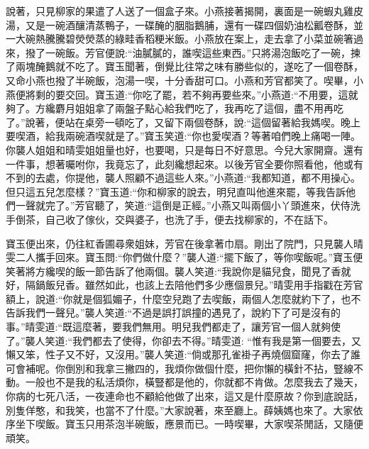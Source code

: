 \begin{parag}
    說著，只見柳家的果遣了人送了一個盒子來。小燕接著揭開，裏面是一碗蝦丸雞皮湯，又是一碗酒釀清蒸鴨子，一碟醃的胭脂鵝脯，還有一碟四個奶油松瓤卷酥，並一大碗熱騰騰碧熒熒蒸的綠畦香稻粳米飯。小燕放在案上，走去拿了小菜並碗箸過來，撥了一碗飯。芳官便說:“油膩膩的，誰喫這些東西。”只將湯泡飯吃了一碗，揀了兩塊醃鵝就不吃了。寶玉聞著，倒覺比往常之味有勝些似的，遂吃了一個卷酥，又命小燕也撥了半碗飯，泡湯一喫，十分香甜可口。小燕和芳官都笑了。喫畢，小燕便將剩的要交回。寶玉道:“你吃了罷，若不夠再要些來。”小燕道:“不用要，這就夠了。方纔麝月姐姐拿了兩盤子點心給我們吃了，我再吃了這個，盡不用再吃了。”說著，便站在桌旁一頓吃了，又留下兩個卷酥，說:“這個留著給我媽喫。晚上要喫酒，給我兩碗酒喫就是了。”寶玉笑道:“你也愛喫酒？等著咱們晚上痛喝一陣。你襲人姐姐和晴雯姐姐量也好，也要喝，只是每日不好意思。今兒大家開齋。還有一件事，想著囑咐你，我竟忘了，此刻纔想起來。以後芳官全要你照看他，他或有不到的去處，你提他，襲人照顧不過這些人來。”小燕道:“我都知道，都不用操心。但只這五兒怎麼樣？”寶玉道:“你和柳家的說去，明兒直叫他進來罷，等我告訴他們一聲就完了。”芳官聽了，笑道:“這倒是正經。”小燕又叫兩個小丫頭進來，伏侍洗手倒茶，自己收了傢伙，交與婆子，也洗了手，便去找柳家的，不在話下。
\end{parag}


\begin{parag}
    寶玉便出來，仍往紅香圃尋衆姐妹，芳官在後拿著巾扇。剛出了院門，只見襲人晴雯二人攜手回來。寶玉問:“你們做什麼？”襲人道:“擺下飯了，等你喫飯呢。”寶玉便笑著將方纔喫的飯一節告訴了他兩個。襲人笑道:“我說你是貓兒食，聞見了香就好，隔鍋飯兒香。雖然如此，也該上去陪他們多少應個景兒。”晴雯用手指戳在芳官額上，說道:“你就是個狐媚子，什麼空兒跑了去喫飯，兩個人怎麼就約下了，也不告訴我們一聲兒。”襲人笑道:“不過是誤打誤撞的遇見了，說約下了可是沒有的事。”晴雯道:“既這麼著，要我們無用。明兒我們都走了，讓芳官一個人就夠使了。”襲人笑道:“我們都去了使得，你卻去不得。”晴雯道: “惟有我是第一個要去，又懶又笨，性子又不好，又沒用。”襲人笑道:“倘或那孔雀褂子再燒個窟窿，你去了誰可會補呢。你倒別和我拿三撇四的，我煩你做個什麼，把你懶的橫針不拈，豎線不動。一般也不是我的私活煩你，橫豎都是他的，你就都不肯做。怎麼我去了幾天，你病的七死八活，一夜連命也不顧給他做了出來，這又是什麼原故？你到底說話，別隻佯憨，和我笑，也當不了什麼。”大家說著，來至廳上。薛姨媽也來了。大家依序坐下喫飯。寶玉只用茶泡半碗飯，應景而已。一時喫畢，大家喫茶閒話，又隨便頑笑。
\end{parag}


